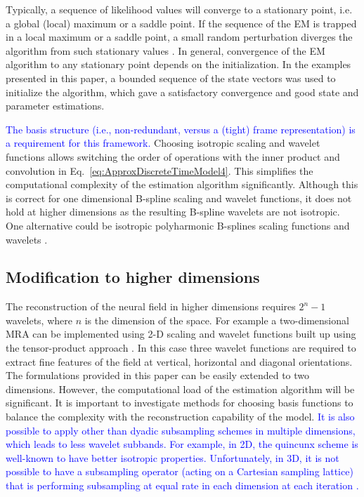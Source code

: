 \documentclass[review,authoryear,3p]{elsarticle}
\newcommand{\parham}[1]{\textcolor{blue}{#1}}
\begin{document}
Typically, a sequence of likelihood values will converge to a stationary point, i.e. a global (local) maximum or a saddle point. If the sequence of the EM is trapped in a local maximum or a saddle point, a small random perturbation diverges the algorithm from such stationary values \citep{McLachlan1997}. In general, convergence of the EM algorithm to any stationary point depends on the initialization. In the examples presented in this paper, a bounded sequence of the state vectors was used to initialize the algorithm, which gave a satisfactory convergence and good state and parameter estimations. 

\parham{The basis structure (i.e., non-redundant, versus a (tight) frame representation) is a requirement for this framework.                                              }Choosing isotropic scaling and wavelet functions allows switching the order of operations with the inner product and convolution in Eq.~\eqref{eq:ApproxDiscreteTimeModel4}. This simplifies the computational complexity of the estimation algorithm significantly. Although this is correct for one dimensional B-spline scaling and wavelet functions, it does not hold at higher dimensions as the resulting B-spline wavelets are not isotropic. One alternative could be  
isotropic polyharmonic B-splines scaling functions and wavelets \citep{VanDeVille2005}.
 \subsection{Modification to higher dimensions}
 The reconstruction of the neural field in higher dimensions requires $2^n-1$ wavelets, where $n$ is the dimension of the space. For example a two-dimensional MRA can be implemented using 2-D scaling and wavelet functions built up using the tensor-product approach \citep{Meyer1992}. In this case three wavelet functions are required to  extract fine features of the field at vertical, horizontal and diagonal orientations. The formulations provided in this paper can be easily extended to two dimensions. However, the computational load of the estimation algorithm will be significant. It is important to investigate methods for choosing basis functions to balance the complexity with the reconstruction capability of the model. \parham{It is also possible to apply other than dyadic subsampling schemes in multiple dimensions, which leads to less wavelet subbands. For example, in 2D, the quincunx scheme is well-known to have better isotropic properties. Unfortunately, in 3D, it is not possible to have a subsampling operator (acting on a Cartesian sampling lattice) that is performing subsampling at equal rate in each dimension at each iteration \citep{VanDeVille2005a}.}
\end{document}

